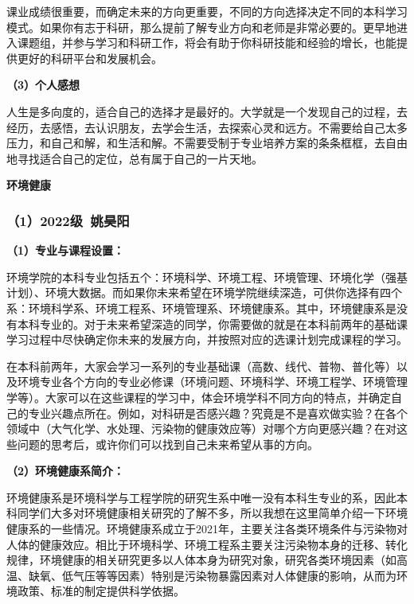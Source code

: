 \documentclass[11pt,oneside]{book}
\begin{document}
\vspace{10pt}

课业成绩很重要，而确定未来的方向更重要，不同的方向选择决定不同的本科学习模式。如果你有志于科研，那么提前了解专业方向和老师是非常必要的。更早地进入课题组，并参与学习和科研工作，将会有助于你科研技能和经验的增长，也能提供更好的科研平台和发展机会。

\vspace{10pt}

\textbf{（3）个人感想}

人生是多向度的，适合自己的选择才是最好的。大学就是一个发现自己的过程，去经历，去感悟，去认识朋友，去学会生活，去探索心灵和远方。不需要给自己太多压力，和自己和解，和生活和解。不需要受制于专业培养方案的条条框框，去自由地寻找适合自己的定位，总有属于自己的一片天地。

\vspace{10pt}

\textbf{环境健康}

\subsubsection{（1）2022级\ 姚昊阳}

\textbf{（1）专业与课程设置：}

环境学院的本科专业包括五个：环境科学、环境工程、环境管理、环境化学（强基计划）、环境大数据。而如果你未来希望在环境学院继续深造，可供你选择有四个系：环境科学系、环境工程系、环境管理系、环境健康系。其中，环境健康系是没有本科专业的。对于未来希望深造的同学，你需要做的就是在本科前两年的基础课学习过程中尽快确定你未来的发展方向，并按照对应的选课计划完成课程的学习。

\vspace{10pt}

在本科前两年，大家会学习一系列的专业基础课（高数、线代、普物、普化等）以及环境专业各个方向的专业必修课（环境问题、环境科学、环境工程学、环境管理学等）。大家可以在这些课程的学习中，体会环境学科不同方向的特点，并确定自己的专业兴趣点所在。例如，对科研是否感兴趣？究竟是不是喜欢做实验？在各个领域中（大气化学、水处理、污染物的健康效应等）对哪个方向更感兴趣？在对这些问题的思考后，或许你们可以找到自己未来希望从事的方向。

\vspace{10pt}

\textbf{（2）环境健康系简介：}

环境健康系是环境科学与工程学院的研究生系中唯一没有本科生专业的系，因此本科同学们大多对环境健康相关研究的了解不多，所以我想在这里简单介绍一下环境健康系的一些情况。环境健康系成立于2021年，主要关注各类环境条件与污染物对人体的健康效应。相比于环境科学、环境工程系主要关注污染物本身的迁移、转化规律，环境健康的相关研究更多以人体本身为研究对象，研究各类环境因素（如高温、缺氧、低气压等等因素）特别是污染物暴露因素对人体健康的影响，从而为环境政策、标准的制定提供科学依据。
\end{document}
